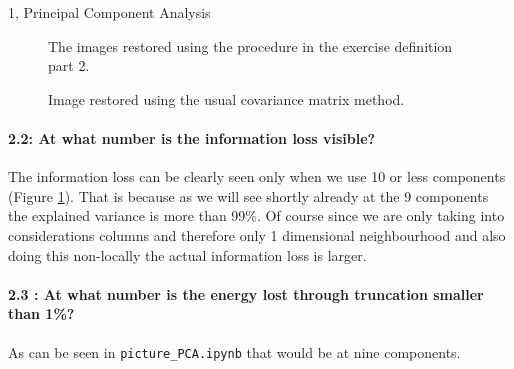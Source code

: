 \begin{task}{1, Principal Component Analysis}
\begin{figure}[H]
    \caption{The images restored using the procedure in the exercise definition part 2.}
    \label{fig:plotImagePCAdirect2}
\end{figure}
\begin{figure}[H]
    \centering
    \caption{Image restored using the usual covariance matrix method.}
    \label{fig:covar}
\end{figure}

\paragraph{2.2: At what number is the information loss visible?}

The information loss can be clearly seen only when we use 10 or less components (Figure \ref{fig:plotImagePCAdirect2}). That is because as we will see shortly already at the 9 components the explained variance is more than 99\%. Of course since we are only taking into considerations columns and therefore only 1 dimensional neighbourhood and also doing this non-locally the actual information loss is larger.

\paragraph{2.3 : At what number is the energy lost through truncation smaller than 1\%?}

As can be seen in \verb+picture_PCA.ipynb+ that would be at nine components.


\end{task}

